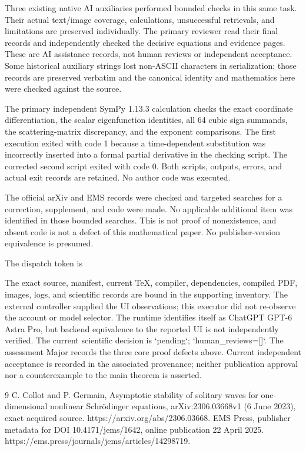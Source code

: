 \documentclass[10pt]{article}
\begin{document}
Three existing native AI auxiliaries performed bounded checks in this same task. Their actual text/image coverage, calculations, unsuccessful retrievals, and limitations are preserved individually. The primary reviewer read their final records and independently checked the decisive equations and evidence pages. These are AI assistance records, not human reviews or independent acceptance. Some historical auxiliary strings lost non-ASCII characters in serialization; those records are preserved verbatim and the canonical identity and mathematics here were checked against the source.\par
The primary independent SymPy 1.13.3 calculation checks the exact coordinate differentiation, the scalar eigenfunction identities, all 64 cubic sign summands, the scattering-matrix discrepancy, and the exponent comparisons. The first execution exited with code 1 because a time-dependent substitution was incorrectly inserted into a formal partial derivative in the checking script. The corrected second script exited with code 0. Both scripts, outputs, errors, and actual exit records are retained. No author code was executed.\par
The official arXiv and EMS records were checked and targeted searches for a correction, supplement, and code were made. No applicable additional item was identified in those bounded searches. This is not proof of nonexistence, and absent code is not a defect of this mathematical paper. No publisher-version equivalence is presumed.\par
The dispatch token is\par
The exact source, manifest, current TeX, compiler, dependencies, compiled PDF, images, logs, and scientific records are bound in the supporting inventory. The external controller supplied the UI observations; this executor did not re-observe the account or model selector. The runtime identifies itself as ChatGPT GPT-6 Astra Pro, but backend equivalence to the reported UI is not independently verified. The current scientific decision is `pending`; `human\_reviews=[]`. The assessment Major records the three core proof defects above. Current independent acceptance is recorded in the associated provenance; neither publication approval nor a counterexample to the main theorem is asserted.\par
9 C. Collot and P. Germain, Asymptotic stability of solitary waves for one-dimensional nonlinear Schrödinger equations, arXiv:2306.03668v1 (6 June 2023), exact acquired source. https://arxiv.org/abs/2306.03668. EMS Press, publisher metadata for DOI 10.4171/jems/1642, online publication 22 April 2025. https://ems.press/journals/jems/articles/14298719.\par
\end{document}
